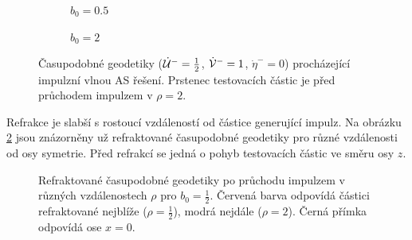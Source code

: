 \begin{figure}[ht]
    \centering
    \begin{subfigure}[b]{0.45\textwidth}
        \caption{$b_0 = 0.5$}
    \end{subfigure}
    \hfill
    \begin{subfigure}[b]{0.45\textwidth}
        \caption{$b_0 = 2$}
    \end{subfigure}
    \caption{Časupodobné geodetiky ($\dot {\mathcal{U}}^-=\frac{1}{2}$, $\dot {\mathcal{V}}^-=1$, $\dot \eta^-=0$) procházející impulzní vlnou AS řešení. Prstenec testovacích částic je před průchodem impulzem v $\rho=2$.}
    \label{fig:AsMatter01}
\end{figure}

Refrakce je slabší s rostoucí vzdáleností od částice generující impulz. Na obrázku \ref{fig:AS_zavislost_na_rho} jsou znázorněny už
refraktované časupodobné geodetiky pro různé vzdálenosti od osy symetrie. Před refrakcí se jedná o pohyb testovacích částic ve směru osy $z$.

\begin{figure}[!ht]
    \centering
    \caption{Refraktované časupodobné geodetiky po průchodu impulzem v různých vzdálenostech $\rho$ pro $b_0 = \frac{1}{2}$.
    Červená barva odpovídá částici refraktované nejblíže ($\rho=\frac{1}{2}$), modrá nejdále ($\rho = 2$). Černá přímka odpovídá
    ose $x=0$.}
    \label{fig:AS_zavislost_na_rho}
\end{figure}


